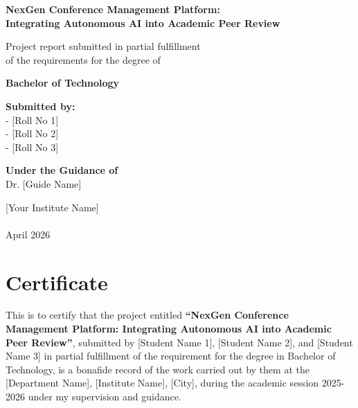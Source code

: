 \documentclass[12pt,a4paper]{report}
\begin{document}
\begin{titlepage}
    \begin{center}
        \vspace*{1cm}
        
        \Huge
        \textbf{NexGen Conference Management Platform:\\ Integrating Autonomous AI into Academic Peer Review}
        
        \vspace{1.5cm}
        
        \Large
        Project report submitted in partial fulfillment\\
        of the requirements for the degree of
        
        \vspace{0.8cm}
        \textbf{Bachelor of Technology}
        
        \vspace{1.5cm}
        \textbf{Submitted by:} \\
        [Student Name 1] - [Roll No 1] \\
        [Student Name 2] - [Roll No 2] \\
        [Student Name 3] - [Roll No 3] 
        
        \vspace{1.5cm}
        \textbf{Under the Guidance of}\\
        Dr. [Guide Name]\\
        [Department Name]
        
        \vfill
        
        \vspace{0.8cm}
        
        \Large
        [Your Institute Name]\\
        [City, State, Country]\\
        April 2026
        
    \end{center}
\end{titlepage}

\chapter*{Certificate}
This is to certify that the project entitled \textbf{“NexGen Conference Management Platform: Integrating Autonomous AI into Academic Peer Review”}, submitted by [Student Name 1], [Student Name 2], and [Student Name 3] in partial fulfillment of the requirement for the degree in Bachelor of Technology, is a bonafide record of the work carried out by them at the [Department Name], [Institute Name], [City], during the academic session 2025-2026 under my supervision and guidance. 
\end{document}
